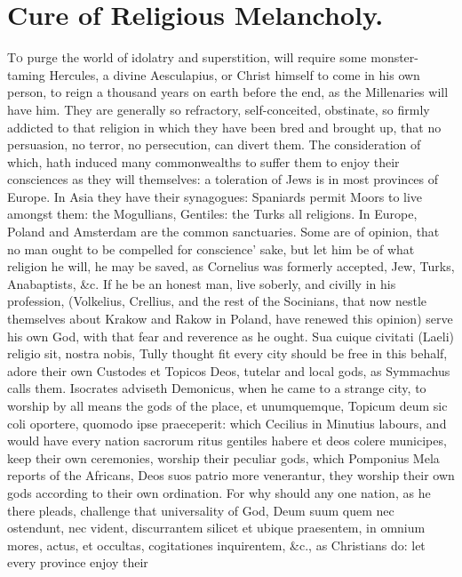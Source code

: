 {%
\section{Cure of Religious Melancholy.}

\lettrine{T}{o} purge the world of idolatry and superstition, will require some
monster-taming Hercules, a divine Aesculapius, or Christ himself to
come in his own person, to reign a thousand years on earth before the
end, as the Millenaries will have him. They are generally so
refractory, self-conceited, obstinate, so firmly addicted to that
religion in which they have been bred and brought up, that no
persuasion, no terror, no persecution, can divert them. The
consideration of which, hath induced many commonwealths to suffer them
to enjoy their consciences as they will themselves: a toleration of
Jews is in most provinces of Europe. In Asia they have their
synagogues: Spaniards permit Moors to live amongst them: the
Mogullians, Gentiles: the Turks all religions. In Europe, Poland and
Amsterdam are the common sanctuaries. Some are of opinion, that no man
ought to be compelled for conscience' sake, but let him be of what
religion he will, he may be saved, as Cornelius was formerly accepted,
Jew, Turks, Anabaptists, \&c. If he be an honest man, live soberly, and
civilly in his profession, (Volkelius, Crellius, and the rest of the
Socinians, that now nestle themselves about Krakow and Rakow in Poland,
have renewed this opinion) serve his own God, with that fear and
reverence as he ought. Sua cuique civitati (Laeli) religio sit, nostra
nobis, Tully thought fit every city should be free in this behalf,
adore their own Custodes et Topicos Deos, tutelar and local gods, as
Symmachus calls them. Isocrates adviseth Demonicus, when he came to a
strange city, to worship by all means the gods of the place, et
unumquemque, Topicum deum sic coli oportere, quomodo ipse praeceperit:
which Cecilius in Minutius labours, and would have every nation
sacrorum ritus gentiles habere et deos colere municipes, keep their own
ceremonies, worship their peculiar gods, which Pomponius Mela reports
of the Africans, Deos suos patrio more venerantur, they worship their
own gods according to their own ordination. For why should any one
nation, as he there pleads, challenge that universality of God, Deum
suum quem nec ostendunt, nec vident, discurrantem silicet et ubique
praesentem, in omnium mores, actus, et occultas, cogitationes
inquirentem, \&c., as Christians do: let every province enjoy their
}
